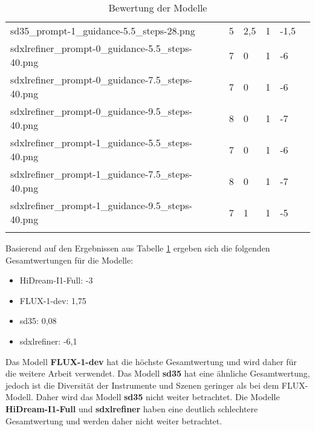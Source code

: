 \begin{table}[h]
\begin{tabular}{llllll}
    sd35\_prompt-1\_guidance-5.5\_steps-28.png & 5 & 2,5 & 1 & -1,5 \\ \addlinespace
    sdxlrefiner\_prompt-0\_guidance-5.5\_steps-40.png & 7 & 0 & 1 & -6 \\ \addlinespace
    sdxlrefiner\_prompt-0\_guidance-7.5\_steps-40.png & 7 & 0 & 1 & -6 \\ \addlinespace
    sdxlrefiner\_prompt-0\_guidance-9.5\_steps-40.png & 8 & 0 & 1 & -7 \\ \addlinespace
    sdxlrefiner\_prompt-1\_guidance-5.5\_steps-40.png & 7 & 0 & 1 & -6 \\ \addlinespace
    sdxlrefiner\_prompt-1\_guidance-7.5\_steps-40.png & 8 & 0 & 1 & -7 \\ \addlinespace
    sdxlrefiner\_prompt-1\_guidance-9.5\_steps-40.png & 7 & 1 & 1 & -5 \\ \addlinespace
    \bottomrule
    \end{tabular}
    \caption{Bewertung der Modelle}
    \label{modelevaluationresults}
\end{table}


Basierend auf den Ergebnissen aus Tabelle \ref{modelevaluationresults} ergeben sich die folgenden Gesamtwertungen für die Modelle:
\begin{itemize}
    \item HiDream-I1-Full: -3
    \item FLUX-1-dev: 1,75
    \item sd35: 0,08
    \item sdxlrefiner: -6,1
\end{itemize}

Das Modell \textbf{FLUX-1-dev} hat die höchste Gesamtwertung und wird daher für die weitere Arbeit verwendet. Das Modell \textbf{sd35} hat eine ähnliche Gesamtwertung, jedoch ist die Diversität der Instrumente und Szenen geringer als bei dem FLUX-Modell. Daher wird das Modell \textbf{sd35} nicht weiter betrachtet. Die Modelle \textbf{HiDream-I1-Full} und \textbf{sdxlrefiner} haben eine deutlich schlechtere Gesamtwertung und werden daher nicht weiter betrachtet.



